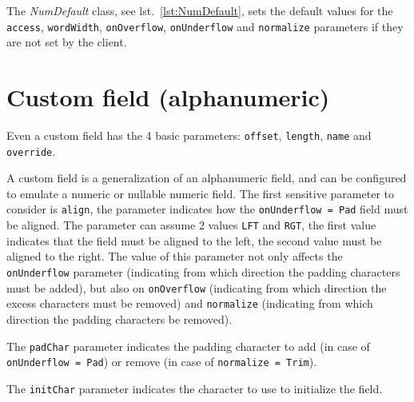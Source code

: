 \documentclass[a4paper,10pt]{report}
\begin{document}
The \textsl{NumDefault} class, see lst.~\ref{lst:NumDefault}, sets the default 
values for the \verb!access!, \verb!wordWidth!, \verb!onOverflow!, 
\texttt{onUnder\-flow} and \verb!normalize! parameters if they are not set by the 
client.

\section{Custom field (alphanumeric)}
Even a custom field has the 4 basic parameters: \verb!offset!, \verb!length!,
\verb!name! and \verb!override!.

A custom field is a generalization of an alphanumeric field, and can be 
configured to emulate a numeric or nullable numeric field. 
The first sensitive parameter to consider is \verb!align!, the parameter 
indicates how the \texttt{onUnderflow = Pad} field must be aligned. 
The parameter can assume 2 values \verb!LFT! and \verb!RGT!, the first value 
indicates that the field must be aligned to the left, the second value must be 
aligned to the right.
The value of this parameter not only affects the \verb!onUnderflow! parameter 
(indicating from which direction the padding characters must be added), but 
also on \verb!onOverflow! (indicating from which direction the excess characters 
must be removed) and \verb!normalize! (indicating from which direction the 
padding characters be removed).

The \verb!padChar! parameter indicates the padding character to add (in case of 
\texttt{onUnderflow = Pad}) or remove (in case of \texttt{normalize = Trim}). 

The \verb!initChar! parameter indicates the character to use to initialize the 
field.
\end{document}
